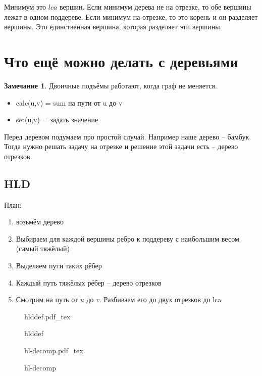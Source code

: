\documentclass{book}
\theoremstyle{definition}
\newtheorem*{note}{Замечание}
\newcommand{\incfig}[1]{%
    \def\svgwidth{\columnwidth}
    {#1.pdf_tex}
}
\begin{document}
\begin{statement}
    Минимум это $lca$ вершин. Если минимум дерева не на отрезке, то обе вершины лежат в одном поддереве. Если минимум на отрезке, то это корень и он разделяет вершины. Это единственная вершина, которая разделяет эти вершины.
\end{statement}

\section{Что ещё можно делать с деревьями}

\begin{note}
    Двоичные подъёмы работают, когда граф не меняется.
\end{note}

\begin{itemize}
   \item  calc(u,v) = sum на пути от u до v
   \item  set(u,v) = задать значение
\end{itemize}

Перед деревом подумаем про простой случай. Например наше дерево -- бамбук. Тогда нужно решать задачу на отрезке и решение этой задачи есть -- дерево отрезков.

\subsection{HLD}

План:
\begin{enumerate}
    \item возьмём дерево
    \item Выбираем для каждой вершины ребро к поддереву с наибольшим весом (самый тяжёлый)
    \item Выделяем пути таких рёбер
    \item Каждый путь тяжёлых рёбер -- дерево отрезков
    \item Смотрим на путь от $u$ до  $v$. Разбиваем его до двух отрезков до lca
\end{enumerate}

\begin{figure}[!ht]
    \centering
    \incfig{hlddef}
    \caption{hlddef}
    \label{fig:hlddef}
\end{figure}

\begin{figure}[!ht]
    \centering
    \incfig{hl-decomp}
    \caption{hl-decomp}
    \label{fig:hl-decomp}
\end{figure}
\end{document}
